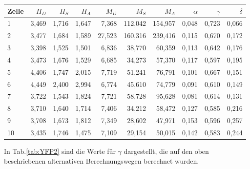 \begin{center}
    \centering
\begin{tabular}{lrrrrrrrrr}
    \toprule
    Zelle &  $H_D$ &  $H_S$ &  $H_A$ &   $M_D$ &    $M_S$ &    $M_A$ &  $\alpha$ &  $\gamma$ &  $\delta$ \\
    \midrule
    1     & 3,469 & 1,716 & 1,647 &  7,368 & 112,042 & 154,957 &  0,048 &  0,723 &  0,066 \\
    2     & 3,477 & 1,684 & 1,589 & 27,523 & 160,316 & 239,416 &  0,115 &  0,670 &  0,172 \\
    3     & 3,398 & 1,525 & 1,501 &  6,836 &  38,770 &  60,359 &  0,113 &  0,642 &  0,176 \\
    4     & 3,473 & 1,676 & 1,529 &  6,685 &  34,273 &  57,370 &  0,117 &  0,597 &  0,195 \\
    5     & 4,406 & 1,747 & 2,015 &  7,719 &  51,241 &  76,791 &  0,101 &  0,667 &  0,151 \\
    6     & 4,449 & 2,400 & 2,994 &  6,774 &  45,610 &  74,779 &  0,091 &  0,610 &  0,149 \\
    7     & 3,722 & 1,543 & 1,824 &  7,721 &  58,728 &  95,628 &  0,081 &  0,614 &  0,131 \\
    8     & 3,710 & 1,640 & 1,714 &  7,406 &  34,212 &  58,472 &  0,127 &  0,585 &  0,216 \\
    9     & 3,708 & 1,673 & 1,812 &  7,349 &  28,602 &  47,971 &  0,153 &  0,596 &  0,257 \\
    10    & 3,435 & 1,746 & 1,475 &  7,109 &  29,154 &  50,015 &  0,142 &  0,583 &  0,244 \\
    \bottomrule
\end{tabular}
\label{tab:YFP1}
\end{center}

In Tab.\ref{tab:YFP2} sind die Werte für $\gamma$ dargestellt, die auf den oben beschriebenen alternativen Berechnungswegen berechnet 
wurden.


